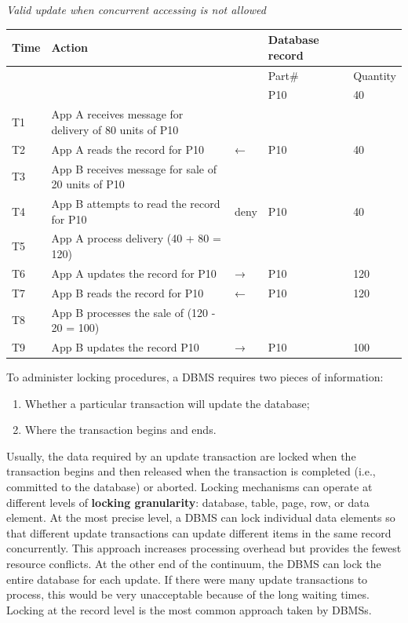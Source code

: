 \documentclass[
]{article}
\begin{document}
\emph{Valid update when concurrent accessing is not allowed}

\begin{longtable}[]{@{}lllll@{}}
\toprule
Time & Action & & Database record & \\
\midrule
\endhead
& & & Part\# & Quantity \\
& & & P10 & 40 \\
T1 & App A receives message for delivery of 80 units of P10 & & & \\
T2 & App A reads the record for P10 & ← & P10 & 40 \\
T3 & App B receives message for sale of 20 units of P10 & & & \\
T4 & App B attempts to read the record for P10 & deny & P10 & 40 \\
T5 & App A process delivery (40 + 80 = 120) & & & \\
T6 & App A updates the record for P10 & → & P10 & 120 \\
T7 & App B reads the record for P10 & ← & P10 & 120 \\
T8 & App B processes the sale of (120 - 20 = 100) & & & \\
T9 & App B updates the record P10 & → & P10 & 100 \\
\bottomrule
\end{longtable}

To administer locking procedures, a DBMS requires two pieces of
information:

\begin{enumerate}
\def\labelenumi{\arabic{enumi}.}
\item
  Whether a particular transaction will update the database;
\item
  Where the transaction begins and ends.
\end{enumerate}

Usually, the data required by an update transaction are locked when the
transaction begins and then released when the transaction is completed
(i.e., committed to the database) or aborted. Locking mechanisms can
operate at different levels of \textbf{locking granularity}: database, table,
page, row, or data element. At the most precise level, a DBMS can lock
individual data elements so that different update transactions can
update different items in the same record concurrently. This approach
increases processing overhead but provides the fewest resource
conflicts. At the other end of the continuum, the DBMS can lock the
entire database for each update. If there were many update transactions
to process, this would be very unacceptable because of the long waiting
times. Locking at the record level is the most common approach taken by
DBMSs.
\end{document}
